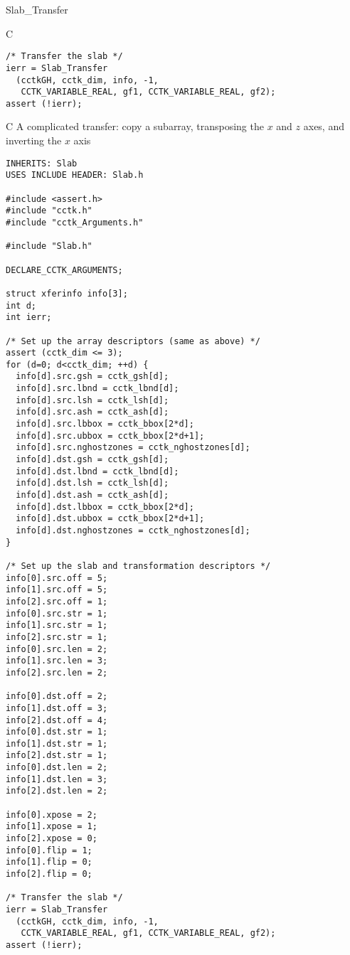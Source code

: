 \begin{FunctionDescription}{Slab\_Transfer}{}
\begin{ExampleSection}
\begin{Example}{C}
\begin{verbatim}
/* Transfer the slab */
ierr = Slab_Transfer
  (cctkGH, cctk_dim, info, -1,
   CCTK_VARIABLE_REAL, gf1, CCTK_VARIABLE_REAL, gf2);
assert (!ierr);
\end{verbatim}
\end{Example}

\begin{Example}{C}
A complicated transfer: copy a subarray, transposing the $x$ and $z$
axes, and inverting the $x$ axis

\begin{verbatim}
INHERITS: Slab
USES INCLUDE HEADER: Slab.h

#include <assert.h>
#include "cctk.h"
#include "cctk_Arguments.h"

#include "Slab.h"

DECLARE_CCTK_ARGUMENTS;

struct xferinfo info[3];
int d;
int ierr;

/* Set up the array descriptors (same as above) */
assert (cctk_dim <= 3);
for (d=0; d<cctk_dim; ++d) {
  info[d].src.gsh = cctk_gsh[d];
  info[d].src.lbnd = cctk_lbnd[d];
  info[d].src.lsh = cctk_lsh[d];
  info[d].src.ash = cctk_ash[d];
  info[d].src.lbbox = cctk_bbox[2*d];
  info[d].src.ubbox = cctk_bbox[2*d+1];
  info[d].src.nghostzones = cctk_nghostzones[d];
  info[d].dst.gsh = cctk_gsh[d];
  info[d].dst.lbnd = cctk_lbnd[d];
  info[d].dst.lsh = cctk_lsh[d];
  info[d].dst.ash = cctk_ash[d];
  info[d].dst.lbbox = cctk_bbox[2*d];
  info[d].dst.ubbox = cctk_bbox[2*d+1];
  info[d].dst.nghostzones = cctk_nghostzones[d];
}

/* Set up the slab and transformation descriptors */
info[0].src.off = 5;
info[1].src.off = 5;
info[2].src.off = 1;
info[0].src.str = 1;
info[1].src.str = 1;
info[2].src.str = 1;
info[0].src.len = 2;
info[1].src.len = 3;
info[2].src.len = 2;

info[0].dst.off = 2;
info[1].dst.off = 3;
info[2].dst.off = 4;
info[0].dst.str = 1;
info[1].dst.str = 1;
info[2].dst.str = 1;
info[0].dst.len = 2;
info[1].dst.len = 3;
info[2].dst.len = 2;

info[0].xpose = 2;
info[1].xpose = 1;
info[2].xpose = 0;
info[0].flip = 1;
info[1].flip = 0;
info[2].flip = 0;

/* Transfer the slab */
ierr = Slab_Transfer
  (cctkGH, cctk_dim, info, -1,
   CCTK_VARIABLE_REAL, gf1, CCTK_VARIABLE_REAL, gf2);
assert (!ierr);
\end{verbatim}
\end{Example}
\end{ExampleSection}

\end{FunctionDescription}



